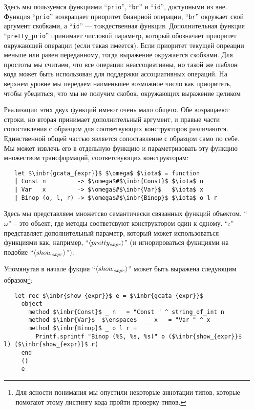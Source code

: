 Здесь мы пользуемся функциями ``\lstinline{prio}'', ``\lstinline{br}'' и ``\lstinline{id}'', доступными из вне. Функция ``\lstinline{prio}''
возвращает приоритет бианрной операции, ``\lstinline{br}'' окружает свой аргумент скобками, а ``\lstinline{id}'' --- тождественная функция.
Дополнительная функция ``\lstinline{pretty_prio}'' принимает числовой параметр, который обозначает приоритет окружающей операции (если такая имеется). Если приоритет текущей опреации меньше или равен переданному, тогда выражение окружается скобками. Для простоты мы считаем, что все операции неассоциативны, но такой же шаблон кода может быть использован для поддержки ассоциативных операций.
На верхнем уровне мы передаем наименьшее возможное число как приоритеть, чтобы убедиться, что мы не получим скобок, окружающих выражение целиком 

Реализации этих двух функций имеют очень мало общего. Обе возращаеют строки, но вторая принимает дополнительный аргумент, и 
правые части сопоставления с образцом для соответвующих конструкторов различаются. Единственной общей частью является
сопоставление с образцом само по себе. Мы может извлечь его в отдельную функцию и параметризовать эту функцию множеством трансформаций, 
соответсвующих конструкторам:

\begin{lstlisting}
   let $\inbr{gcata_{expr}}$ $\omega$ $\iota$ = function
   | Const n         -> $\omega$#$\inbr{Const}$ $\iota$ n
   | Var   x         -> $\omega$#$\inbr{Var}$   $\iota$ x
   | Binop (o, l, r) -> $\omega$#$\inbr{Binop}$ $\iota$ o l r
\end{lstlisting}

Здесь мы представляем множетсво семантически связанных функций объектом. ``$\omega$'' -- это объект, где методы соответсвуют конструктором
один к одному. ``$\iota$'' представляет дополнительный параметр, который может использоваться функциями как, например, ``$\left<pretty_{expr}\right>$'' (и игнорироваться фукнциями на подобие ``$\left<show_{expr}\right>$'').

Упомянутая в начале фукция ``$\left<show_{expr}\right>$'' может быть выражена следующим образом\footnote{Для ясности понимания мы опустили некоторые аннотации типов, которые помогают этому листингу кода пройти проверку типов.}:

\begin{lstlisting}
   let rec $\inbr{show_{expr}}$ e = $\inbr{gcata_{expr}}$
     object
       method $\inbr{Const}$ _ n   = "Const " ^ string_of_int n
       method $\inbr{Var}$  $\enspace$   _ x   = "Var " ^ x
       method $\inbr{Binop}$ _ o l r =
         Printf.sprintf "Binop (%S, %s, %s)" o ($\inbr{show_{expr}}$ l) ($\inbr{show_{expr}}$ r)
     end
     ()
     e
\end{lstlisting}


